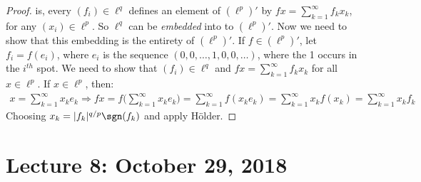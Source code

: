 \begin{proof}
                is, every $(f_{i})\in\ell^{q}$ defines an element
                of $(\ell^{p})'$ by
                $fx=\sum_{k=1}^{\infty}f_{k}x_{k}$, for any
                $(x_{i})\in\ell^{p}$. So $\ell^{q}$ can
                be \textit{embedded} into to $(\ell^{p})'$.
                Now we need to show that this embedding is
                the entirety of $(\ell^{p})'$. If
                $f\in(\ell^{p})'$, let
                $f_{i}=f(e_{i})$, where $e_{i}$ is the
                sequence $(0,0,\hdots,1,0,0,\hdots)$, where
                the 1 occurs in the $i^{th}$ spot. We need
                to show that $(f_{i})\in\ell^{q}$ and
                $fx=\sum_{k=1}^{\infty}f_{k}x_{k}$
                for all $x\in\ell^{p}$. If $x\in\ell^{p}$, then:
                \begin{align*}
                    x=\sum_{k=1}^{\infty}x_{k}e_{k}
                    \Rightarrow
                    fx=f\Big(\sum_{k=1}^{\infty}x_{k}e_{k}\Big)
                    =\sum_{k=1}^{\infty}f(x_{k}e_{k})
                    =\sum_{k=1}^{\infty}x_{k}f(x_{k})
                    =\sum_{k=1}^{\infty}x_{k}f_{k}
                \end{align*}
                Choosing $x_{k}=|f_{k}|^{q/p}\sgn(f_{k})$ and apply
                H\"{o}lder.
            \end{proof}
    \section{Lecture 8: October 29, 2018}
